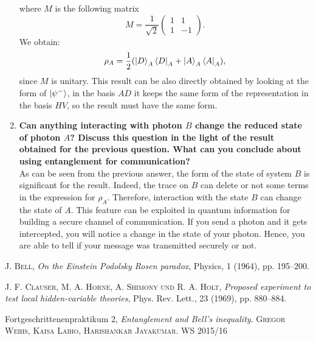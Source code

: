 \documentclass[a4paper,10pt]{article}
\begin{document}
\begin{enumerate}
where $M$ is the following matrix
\[M = \frac{1}{\sqrt{2}}\begin{pmatrix}
  1 & 1  \\
  1 & -1
 \end{pmatrix}.\]
 We obtain:
 \[\rho_A = \frac{1}{2}(\ket{D}_A \bra{D}_A +\ket{A}_A \bra{A}_A),\]
since $M$ is unitary. This result can be also directly obtained by looking at the form of $\ket{\psi^-}$, in the basis $AD$ it keeps the same form of the representation in the basis $HV$, so the result must have the same form.
\item \textbf{Can anything interacting with photon $B$ change the reduced state of photon $A$? Discuss this question in the light of the result obtained for the previous question. What can you conclude about using entanglement for communication?}\\
As can be seen from the previous answer, the form of the state of system $B$ is significant for the result. Indeed, the trace on $B$ can delete or not some terms in the expression for $\rho_A$. Therefore, interaction with the state $B$ can change the state of $A$. This feature can be exploited in quantum information for building a secure channel of communication. If you send a photon and it gets intercepted, you will notice a change in the state of your photon. Hence, you are able to tell if your message was transmitted securely or not.
\end{enumerate}

 \begin{thebibliography}{99}

     \textsc{J. Bell}, \textit{On the Einstein Podolsky Rosen paradox}, Physics, 1 (1964), pp. 195–200.

   \textsc{J. F. Clauser, M. A. Horne, A. Shimony und R. A. Holt}, \textit{Proposed experiment to
test local hidden-variable theories}, Phys. Rev. Lett., 23 (1969), pp. 880–884.

Fortgeschrittenenpraktikum 2, \textit{Entanglement and Bell’s inequality}. \textsc{Gregor Weihs, Kaisa Laiho, Harishankar Jayakumar}. WS 2015/16
\end{thebibliography}
\end{document}
